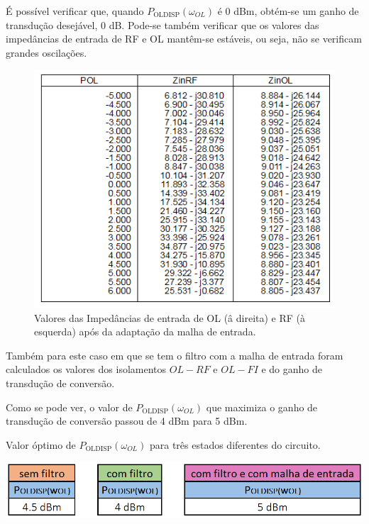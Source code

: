 \documentclass[11pt]{article}
\numberwithin{equation}{section}
\begin{document}
É possível verificar que, quando $ P_{\text{OLDISP}}\left(\omega_{OL}\right) $ é 0 dBm, obtém-se um ganho de transdução desejável, 0 dB. Pode-se também verificar que  os valores das impedâncias de entrada de RF e OL mantêm-se estáveis, ou seja, não se verificam grandes oscilações.

\begin{figure}[h]
\centering
\includegraphics[keepaspectratio=true, scale=0.46]{exps/Z_21}
\vspace{-0.5em}
\caption{Valores das Impedâncias de entrada de OL (â direita) e RF (à esquerda) após da adaptação da malha de entrada.}
\vspace{-0.8em}
\label{fig:Imp_OL_RF_21}
\end{figure}

Também para este caso em que se tem o filtro com a malha de entrada foram calculados os valores dos isolamentos $OL - RF$ e $OL - FI$ e do ganho de transdução de conversão.

Como se pode ver, o valor de $ P_{\text{OLDISP}}\left(\omega_{OL}\right) $ que maximiza o ganho de transdução de conversão passou de 4 dBm para 5 dBm.

\begin{table}[h]
	\centering
	\caption{Valor óptimo de $ P_{\text{OLDISP}}\left(\omega_{OL}\right) $ para três estados diferentes do circuito.}
	\vspace{-1.5mm}
	\includegraphics[keepaspectratio=true, scale=0.45]{teoricas/poldispSemComFiltroMalha}
\end{table}
\end{document}
